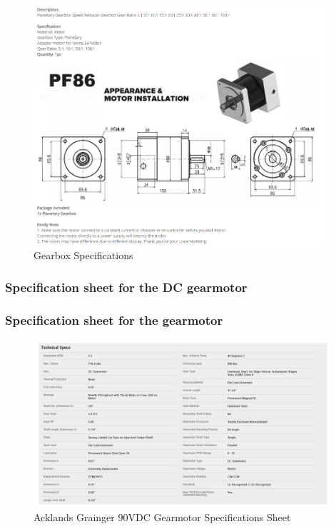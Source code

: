 \begin{figure}[H]
    \centering
    \includegraphics[width=0.98\textwidth]{Sections/Appendices/GearBox_specs.PNG}
    \caption{Gearbox Specifications \cite{banggood_nema_nodate}}
    \label{fig:gearbox_spec}
\end{figure}

\subsubsection{Specification sheet for the DC gearmotor \cite{mcmaster-carr_gearmotors_nodate}}



\subsubsection{Specification sheet for the gearmotor \cite{acklands_grainger_dc_nodate}}
\begin{figure}[H]
    \centering
    \includegraphics[width=0.98\textwidth]{Sections/Appendices/SpecsAcklandMotors.PNG}
    \caption{Acklands Grainger 90VDC Gearmotor Specifications Sheet \cite{acklands_grainger_dc_nodate}}
    \label{fig:ackland_spec}
\end{figure}
